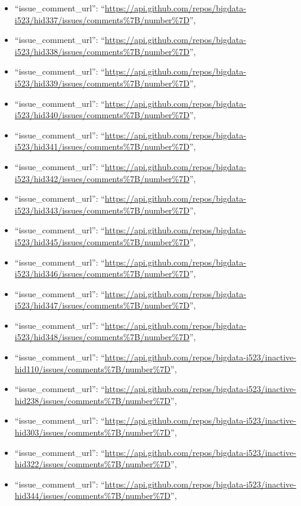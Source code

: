 \begin{itemize}
\item
  ``issue\_comment\_url'':
  ``\url{https://api.github.com/repos/bigdata-i523/hid337/issues/comments\%7B/number\%7D}'',
\item
  ``issue\_comment\_url'':
  ``\url{https://api.github.com/repos/bigdata-i523/hid338/issues/comments\%7B/number\%7D}'',
\item
  ``issue\_comment\_url'':
  ``\url{https://api.github.com/repos/bigdata-i523/hid339/issues/comments\%7B/number\%7D}'',
\item
  ``issue\_comment\_url'':
  ``\url{https://api.github.com/repos/bigdata-i523/hid340/issues/comments\%7B/number\%7D}'',
\item
  ``issue\_comment\_url'':
  ``\url{https://api.github.com/repos/bigdata-i523/hid341/issues/comments\%7B/number\%7D}'',
\item
  ``issue\_comment\_url'':
  ``\url{https://api.github.com/repos/bigdata-i523/hid342/issues/comments\%7B/number\%7D}'',
\item
  ``issue\_comment\_url'':
  ``\url{https://api.github.com/repos/bigdata-i523/hid343/issues/comments\%7B/number\%7D}'',
\item
  ``issue\_comment\_url'':
  ``\url{https://api.github.com/repos/bigdata-i523/hid345/issues/comments\%7B/number\%7D}'',
\item
  ``issue\_comment\_url'':
  ``\url{https://api.github.com/repos/bigdata-i523/hid346/issues/comments\%7B/number\%7D}'',
\item
  ``issue\_comment\_url'':
  ``\url{https://api.github.com/repos/bigdata-i523/hid347/issues/comments\%7B/number\%7D}'',
\item
  ``issue\_comment\_url'':
  ``\url{https://api.github.com/repos/bigdata-i523/hid348/issues/comments\%7B/number\%7D}'',
\item
  ``issue\_comment\_url'':
  ``\url{https://api.github.com/repos/bigdata-i523/inactive-hid110/issues/comments\%7B/number\%7D}'',
\item
  ``issue\_comment\_url'':
  ``\url{https://api.github.com/repos/bigdata-i523/inactive-hid238/issues/comments\%7B/number\%7D}'',
\item
  ``issue\_comment\_url'':
  ``\url{https://api.github.com/repos/bigdata-i523/inactive-hid303/issues/comments\%7B/number\%7D}'',
\item
  ``issue\_comment\_url'':
  ``\url{https://api.github.com/repos/bigdata-i523/inactive-hid322/issues/comments\%7B/number\%7D}'',
\item
  ``issue\_comment\_url'':
  ``\url{https://api.github.com/repos/bigdata-i523/inactive-hid344/issues/comments\%7B/number\%7D}'',

\end{itemize}
